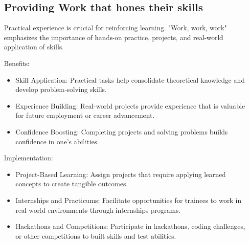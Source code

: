 \subsection{Providing Work that hones their skills}


Practical experience is crucial for reinforcing learning. "Work, work, work" emphasizes the importance of hands-on practice, projects, and real-world application of skills.

Benefits:
\begin{itemize}
    \item Skill Application: Practical tasks help consolidate theoretical knowledge and develop problem-solving skills.
    \item Experience Building: Real-world projects provide experience that is valuable for future employment or career advancement.
    \item Confidence Boosting: Completing projects and solving problems builds confidence in one’s abilities.
\end{itemize}
Implementation:
\begin{itemize}
    \item Project-Based Learning: Assign projects that require applying learned concepts to create tangible outcomes.
    \item Internships and Practicums: Facilitate opportunities for trainees to work in real-world environments through internships programs.
    \item Hackathons and Competitions: Participate in hackathons, coding challenges, or other competitions to built skills and test abilities. 
\end{itemize}    
    
